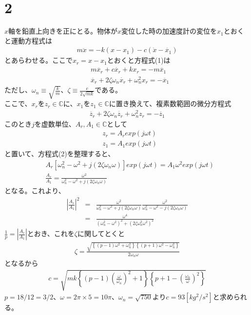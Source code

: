 \documentclass[pdflatex,ja=standard,fleqn]{bxjsarticle}
\begin{document}
\section*{2}
$x$軸を鉛直上向きを正にとる。物体が$x$変位した時の加速度計の変位を$x_{1}$とおくと運動方程式は
\begin{eqnarray}
    m\ddot{x}=-k(x-x_{1})-c(\dot{x}-\dot{x_{1}})
\end{eqnarray}
とあらわせる。ここで$x_{r}=x-x_{1}$とおくと方程式(1)は
\begin{align*}
    &m\ddot{x_{r}}+c\dot{x_{r}}+kx_{r}=-m\ddot{x_{1}}\\
    &\ddot{x_{r}}+2\zeta\omega_{n}\dot{x_{r}}+\omega_{n}^{2}x_{r}=-\ddot{x_{1}}
\end{align*}
ただし、$\omega_{n}\equiv\sqrt{\frac{k}{m}}$、$\zeta\equiv\frac{c}{2\sqrt{mk}}$である。\\
ここで、$x_{r}$を$z_{r}\in\mathbb{C}$に、$x_{1}$を$z_{1}\in\mathbb{C}$に置き換えて、複素数範囲の微分方程式
\begin{eqnarray}
    \ddot{z_{r}}+2\zeta\omega_{n}\dot{z_{r}}+\omega_{n}^{2}z_{r}=-\ddot{z_{1}}
\end{eqnarray}
このとき$j$を虚数単位、$A_{r},A_{1}\in\mathbb{C}$として
\begin{align*}
    &z_{r}=A_{r}exp(j\omega t)\\
    &z_{1}=A_{1}exp(j\omega t)
\end{align*}
と置いて、方程式(2)を整理すると、
\begin{align*}
    &A_{r}\left[\omega_{n}^{2}-\omega^{2}+j(2\zeta\omega_{n}\omega)\right]exp(j\omega t)=A_{1}\omega^{2}exp(j\omega t)\\
    &\frac{A_{r}}{A_{1}}=\frac{\omega^{2}}{\omega_{n}^{2}-\omega^{2}+j(2\zeta\omega_{n}\omega)}
\end{align*}
となる。これより、
\begin{eqnarray*}
    \left|\frac{A_{r}}{A_{1}}\right|^{2}&=&\frac{\omega^{2}}{\omega_{n}^{2}-\omega^{2}+j(2\zeta\omega_{n}\omega)}\frac{\omega^{2}}{\omega_{n}^{2}-\omega^{2}-j(2\zeta\omega_{n}\omega)}\\
    &=&\frac{\omega^{4}}{(\omega_{n}^{2}-\omega^{2})^{2}+(2\zeta\omega_{n}^{2}\omega^{2})^{2}}
\end{eqnarray*}
$\frac{1}{p}=|\frac{A_{r}}{A_{1}}|$とおき、これを$\zeta$に関してとくと
\begin{eqnarray*}
    \zeta=\frac{\sqrt{\left\{(p-1)\omega^{2}+\omega_{n}^{2}\right\}\left\{(p+1)\omega^{2}-\omega_{n}^{2}\right\}}}{2\omega_{n}\omega}
\end{eqnarray*}
となるから
\begin{eqnarray*}
    c=\sqrt{mk\left\{\left(p-1\right)\left(\frac{\omega}{\omega_{n}}\right)^{2}+1\right\}\left\{p+1-\left(\frac{\omega_{n}}{\omega}\right)^{2}\right\}}
\end{eqnarray*}
$p=18/12=3/2$、$\omega=2\pi×5=10\pi$、$\omega_{n}=\sqrt{750}$より$c=93[kg^{2}/s^{2}]$と求められる。
\end{document}
